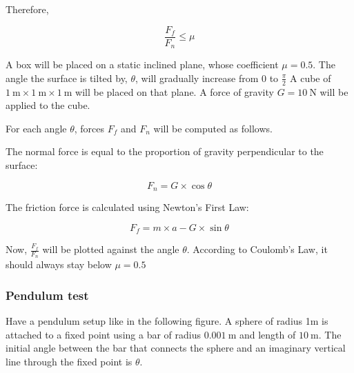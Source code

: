 \documentclass[12pt]{article}
\begin{document}
Therefore,

\begin{equation}
\frac{F_f}{F_n} \leq \mu
\end{equation}

A box will be placed on a static inclined plane, whose coefficient $\mu = 0.5$.
The angle the surface is tilted by, $\theta$, will gradually increase from 0 to $\frac{\pi}{2}$
A cube of $\SI{1}{\m} \times \SI{1}{\m} \times \SI{1}{\m}$ will be placed on that plane.
A force of gravity $G = \SI{10}{\N}$ will be applied to the cube.

\begin{center}
  \end{center}

For each angle $\theta$, forces $F_f$ and $F_n$ will be computed as follows.

The normal force is equal to the proportion of gravity perpendicular to the surface:

\begin{equation}
F_n = G \times \cos \theta
\end{equation}

The friction force is calculated using Newton's First Law:

\begin{equation}
F_f = m \times a - G \times \sin \theta
\end{equation}

Now, $\frac{F_f}{F_n}$ will be plotted against the angle $\theta$. According to Coulomb's Law, it should always stay below $\mu = 0.5$

\subsubsection{Pendulum test}

Have a pendulum setup like in the following figure.
A sphere of radius 1m is attached to a fixed point using a bar of radius $\SI{0.001}{\m}$ and length of $\SI{10}{\m}$.
The initial angle between the bar that connects the sphere and an imaginary vertical line through the fixed point is $\theta$.
\end{document}
